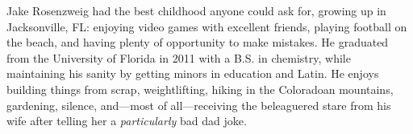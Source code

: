 

Jake Rosenzweig had the best childhood anyone could ask for, growing up in Jacksonville, FL: enjoying video games with excellent friends, playing football on the beach, and having plenty of opportunity to make mistakes.
He graduated from the University of Florida in 2011 with a B.S. in chemistry, while maintaining his sanity by getting minors in education and Latin.
He enjoys building things from scrap, weightlifting, hiking in the Coloradoan mountains, gardening, silence, and---most of all---receiving the beleaguered stare from his wife after telling her a \emph{particularly} bad dad joke.

